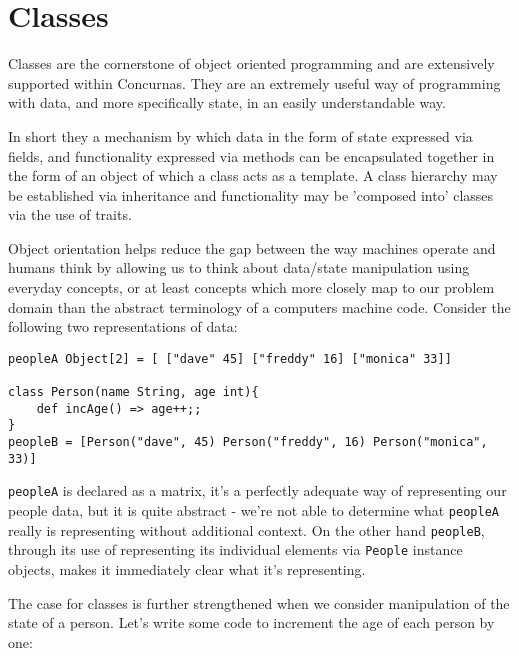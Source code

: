 \documentclass[conc-doc]{subfiles}
\begin{document}
	
	\chapter[Classes]{Classes}
	\label{ch:classes}



Classes are the cornerstone of object oriented programming and are extensively supported within Concurnas. They are an extremely useful way of programming with data, and more specifically state, in an easily understandable way. 

In short they a mechanism by which data in the form of state expressed via fields, and functionality expressed via methods can be encapsulated together in the form of an object of which a class acts as a template. A class hierarchy may be established via inheritance and functionality may be 'composed into' classes via the use of traits.

Object orientation helps reduce the gap between the way machines operate and humans think by allowing us to think about data/state manipulation using everyday concepts, or at least concepts which more closely map to our problem domain than the abstract terminology of a computers machine code. Consider the following two representations of data:

\begin{lstlisting}
peopleA Object[2] = [ ["dave" 45] ["freddy" 16] ["monica" 33]]

class Person(name String, age int){
	def incAge() => age++;;
}
peopleB = [Person("dave", 45) Person("freddy", 16) Person("monica", 33)]
\end{lstlisting}

\lstinline{peopleA} is declared as a matrix, it's a perfectly adequate way of representing our people data, but it is quite abstract - we're not able to determine what \lstinline{peopleA} really is representing without additional context. On the other hand \lstinline{peopleB}, through its use of representing its individual elements via \lstinline{People} instance objects, makes it immediately clear what it's representing.

The case for classes is further strengthened when we consider manipulation of the state of a person. Let's write some code to increment the age of each person by one:
\end{document}
